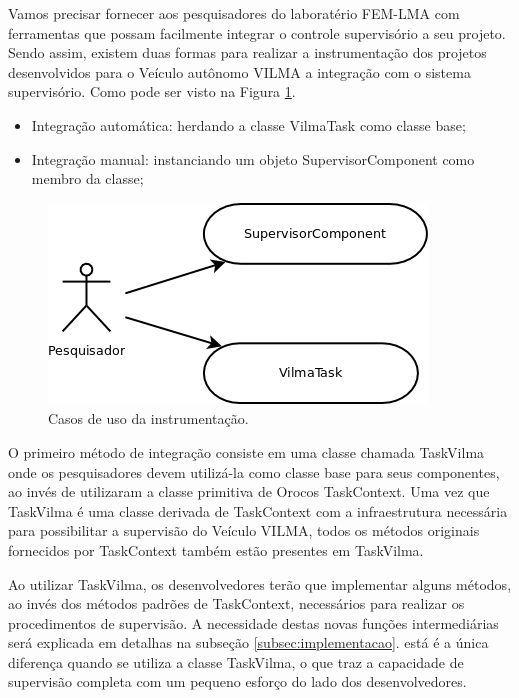\documentclass[conference]{IEEEtran}
\begin{document}
Vamos precisar fornecer aos pesquisadores do laboratério FEM-LMA com ferramentas que possam facilmente integrar o controle supervisório a seu projeto. Sendo assim, existem duas formas para realizar a instrumentação dos projetos desenvolvidos para o Veículo autônomo VILMA a integração com o sistema supervisório. Como pode ser visto na Figura \ref{fig:use_case_instrumentacao}.

\begin{itemize}
	\item Integração automática: herdando a classe VilmaTask como classe base;
	\item Integração manual: instanciando um objeto SupervisorComponent como membro da classe;
\end{itemize}

\begin{figure}[h]
	\centering
	\includegraphics[scale=0.22]{files/USE_CASE_INSTRUMENTATION.png}
	\caption{Casos de uso da instrumentação.}
	\label{fig:use_case_instrumentacao}
\end{figure}

O primeiro método de integração consiste em uma classe chamada TaskVilma onde os pesquisadores devem utilizá-la como classe base para seus componentes, ao invés de utilizaram a classe primitiva de Orocos TaskContext. Uma vez que TaskVilma é uma classe derivada de TaskContext com a infraestrutura necessária para possibilitar a supervisão do Veículo VILMA, todos os métodos originais fornecidos por TaskContext também estão presentes em TaskVilma.

Ao utilizar TaskVilma, os desenvolvedores terão que implementar alguns métodos, ao invés dos métodos padrões de TaskContext, necessários para realizar os procedimentos de supervisão. A necessidade destas novas funções intermediárias será explicada em detalhas na subseção \ref{subsec:implementacao}. está é a única diferença quando se utiliza a classe TaskVilma, o que traz a capacidade de supervisão completa com um pequeno esforço do lado dos desenvolvedores.
\end{document}
